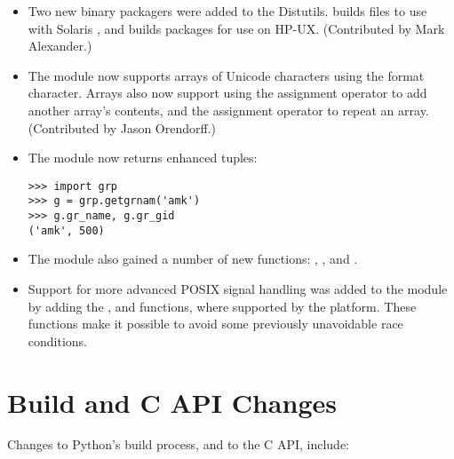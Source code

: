 \documentclass{howto}
\begin{document}
\begin{itemize}
\item Two new binary packagers were added to the Distutils.
 builds  files to use with Solaris
, and  builds 
packages for use on HP-UX.  (Contributed by Mark Alexander.)

\item The  module now supports arrays of Unicode
characters using the  format character.  Arrays also 
now support using the \code{+=} assignment operator to add another array's
contents, and the \code{*=} assignment operator to repeat an array.
(Contributed by Jason Orendorff.)

\item The  module now returns enhanced tuples:

\begin{verbatim}
>>> import grp
>>> g = grp.getgrnam('amk')
>>> g.gr_name, g.gr_gid
('amk', 500)
\end{verbatim}

\item The  module also gained a number of new
functions: ,
, and .

\item Support for more advanced POSIX signal handling was added
to the  module by adding the ,
 and  functions, where supported
by the platform.  These functions make it possible to avoid some previously
unavoidable race conditions.

\end{itemize}


\section{Build and C API Changes}

Changes to Python's build process, and to the C API, include:
\end{document}
